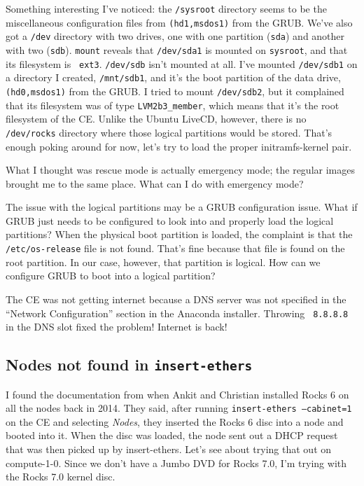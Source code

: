 \documentclass[12pt]{article}
\begin{document}
\qq Something interesting I've noticed: the {\tt /sysroot} directory seems to be
the miscellaneous configuration files from {\tt (hd1,msdos1)} from the
GRUB. We've also got a {\tt /dev} directory with two drives, one with one
partition ({\tt sda}) and another with two ({\tt sdb}). {\tt mount} reveals that
{\tt /dev/sda1} is mounted on {\tt sysroot}, and that its filesystem is {\tt
  ext3}. {\tt /dev/sdb} isn't mounted at all. I've mounted {\tt /dev/sdb1} on a
directory I created, {\tt /mnt/sdb1}, and it's the boot partition of the data
drive, {\tt (hd0,msdos1)} from the GRUB. I tried to mount {\tt /dev/sdb2}, but
it complained that its filesystem was of type {\tt LVM2b3\_member}, which means
that it's the root filesystem of the CE. Unlike the Ubuntu LiveCD, however,
there is no {\tt /dev/rocks} directory where those logical partitions would be
stored. That's enough poking around for now, let's try to load the proper
initramfs-kernel pair.

\qq What I thought was rescue mode is actually emergency mode; the regular
images brought me to the same place. What can I do with emergency mode?

\qq The issue with the logical partitions may be a GRUB configuration
issue. What if GRUB just needs to be configured to look into and properly load
the logical partitions? When the physical boot partition is loaded, the
complaint is that the {\tt /etc/os-release} file is not found. That's fine
because that file is found on the root partition. In our case, however, that
partition is logical. How can we configure GRUB to boot into a logical
partition?

\begin{tcolorbox}[title=RESOLUTION, colback=white, colframe=green!40!black]
  The CE was not getting internet because a DNS server was not specified in the
  ``Network Configuration'' section in the Anaconda installer. Throwing {\tt
    8.8.8.8} in the DNS slot fixed the problem! Internet is back!
\end{tcolorbox}

\subsection{Nodes not found in {\tt insert-ethers}}

\qq I found the documentation from when Ankit and Christian installed Rocks 6 on
all the nodes back in 2014. They said, after running {\tt insert-ethers
  --cabinet=1} on the CE and selecting \textit{Nodes}, they inserted the Rocks 6
disc into a node and booted into it. When the disc was loaded, the node sent out
a DHCP request that was then picked up by insert-ethers. Let's see about trying
that out on compute-1-0. Since we don't have a Jumbo DVD for Rocks 7.0, I'm
trying with the Rocks 7.0 kernel disc.
\end{document}
